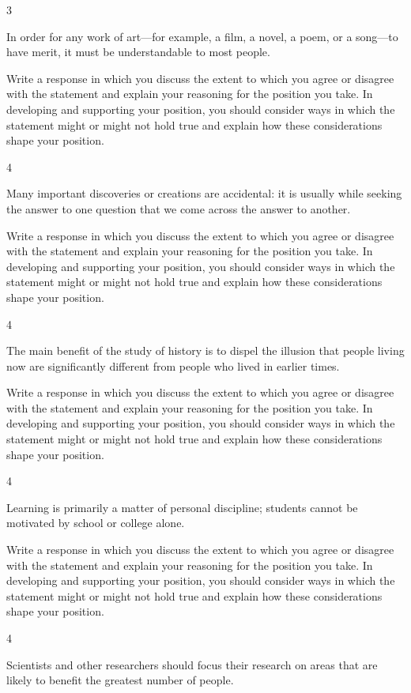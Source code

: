 \documentclass[]{article}
\begin{document}
3

In order for any work of art---for example, a film, a novel, a poem, or
a song---to have merit, it must be understandable to most people.

Write a response in which you discuss the extent to which you agree or
disagree with the statement and explain your reasoning for the position
you take. In developing and supporting your position, you should
consider ways in which the statement might or might not hold true and
explain how these considerations shape your position.

4

Many important discoveries or creations are accidental: it is usually
while seeking the answer to one question that we come across the answer
to another.

Write a response in which you discuss the extent to which you agree or
disagree with the statement and explain your reasoning for the position
you take. In developing and supporting your position, you should
consider ways in which the statement might or might not hold true and
explain how these considerations shape your position.

4

The main benefit of the study of history is to dispel the illusion that
people living now are significantly different from people who lived in
earlier times.

Write a response in which you discuss the extent to which you agree or
disagree with the statement and explain your reasoning for the position
you take. In developing and supporting your position, you should
consider ways in which the statement might or might not hold true and
explain how these considerations shape your position.

4

Learning is primarily a matter of personal discipline; students cannot
be motivated by school or college alone.

Write a response in which you discuss the extent to which you agree or
disagree with the statement and explain your reasoning for the position
you take. In developing and supporting your position, you should
consider ways in which the statement might or might not hold true and
explain how these considerations shape your position.

4

Scientists and other researchers should focus their research on areas
that are likely to benefit the greatest number of people.
\end{document}
